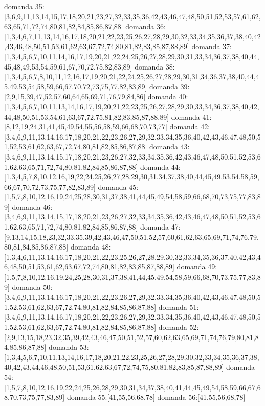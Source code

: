 domanda 35:[3,6,9,11,13,14,15,17,18,20,21,23,27,32,33,35,36,42,43,46,47,48,50,51,52,53,57,61,62,63,65,71,72,74,80,81,82,84,85,86,87,88]
domanda 36:[1,3,4,6,7,11,13,14,16,17,18,20,21,22,23,25,26,27,28,29,30,32,33,34,35,36,37,38,40,42,43,46,48,50,51,53,61,62,63,67,72,74,80,81,82,83,85,87,88,89]
domanda 37:[1,3,4,5,6,7,10,11,14,16,17,19,20,21,22,24,25,26,27,28,29,30,31,33,34,36,37,38,40,44,45,48,49,53,54,59,61,67,70,72,75,82,83,89]
domanda 38:[1,3,4,5,6,7,8,10,11,12,16,17,19,20,21,22,24,25,26,27,28,29,30,31,34,36,37,38,40,44,45,49,53,54,58,59,66,67,70,72,73,75,77,82,83,89]
domanda 39:[2,9,15,39,47,52,57,60,64,65,69,71,76,79,84,86]
domanda 40:[1,3,4,5,6,7,10,11,13,14,16,17,19,20,21,22,23,25,26,27,28,29,30,33,34,36,37,38,40,42,44,48,50,51,53,54,61,63,67,72,75,81,82,83,85,87,88,89]
domanda 41:[8,12,19,24,31,41,45,49,54,55,56,58,59,66,68,70,73,77]
domanda 42:[3,4,6,9,11,13,14,16,17,18,20,21,22,23,26,27,29,32,33,34,35,36,40,42,43,46,47,48,50,51,52,53,61,62,63,67,72,74,80,81,82,85,86,87,88]
domanda 43:[3,4,6,9,11,13,14,15,17,18,20,21,23,26,27,32,33,34,35,36,42,43,46,47,48,50,51,52,53,61,62,63,65,71,72,74,80,81,82,84,85,86,87,88]
domanda 44:[1,3,4,5,7,8,10,12,16,19,22,24,25,26,27,28,29,30,31,34,37,38,40,44,45,49,53,54,58,59,66,67,70,72,73,75,77,82,83,89]
domanda 45:[1,5,7,8,10,12,16,19,24,25,28,30,31,37,38,41,44,45,49,54,58,59,66,68,70,73,75,77,83,89]
domanda 46:[3,4,6,9,11,13,14,15,17,18,20,21,23,26,27,32,33,34,35,36,42,43,46,47,48,50,51,52,53,61,62,63,65,71,72,74,80,81,82,84,85,86,87,88]
domanda 47:[9,13,14,15,18,23,32,33,35,39,42,43,46,47,50,51,52,57,60,61,62,63,65,69,71,74,76,79,80,81,84,85,86,87,88]
domanda 48:[1,3,4,6,11,13,14,16,17,18,20,21,22,23,25,26,27,28,29,30,32,33,34,35,36,37,40,42,43,46,48,50,51,53,61,62,63,67,72,74,80,81,82,83,85,87,88,89]
domanda 49:[1,5,7,8,10,12,16,19,24,25,28,30,31,37,38,41,44,45,49,54,58,59,66,68,70,73,75,77,83,89]
domanda 50:[3,4,6,9,11,13,14,16,17,18,20,21,22,23,26,27,29,32,33,34,35,36,40,42,43,46,47,48,50,51,52,53,61,62,63,67,72,74,80,81,82,84,85,86,87,88]
domanda 51:[3,4,6,9,11,13,14,16,17,18,20,21,22,23,26,27,29,32,33,34,35,36,40,42,43,46,47,48,50,51,52,53,61,62,63,67,72,74,80,81,82,84,85,86,87,88]
domanda 52:[2,9,13,15,18,23,32,35,39,42,43,46,47,50,51,52,57,60,62,63,65,69,71,74,76,79,80,81,84,85,86,87,88]
domanda 53:[1,3,4,5,6,7,10,11,13,14,16,17,18,20,21,22,23,25,26,27,28,29,30,32,33,34,35,36,37,38,40,42,43,44,46,48,50,51,53,61,62,63,67,72,74,75,80,81,82,83,85,87,88,89]
domanda 54:[1,5,7,8,10,12,16,19,22,24,25,26,28,29,30,31,34,37,38,40,41,44,45,49,54,58,59,66,67,68,70,73,75,77,83,89]
domanda 55:[41,55,56,68,78]
domanda 56:[41,55,56,68,78]
